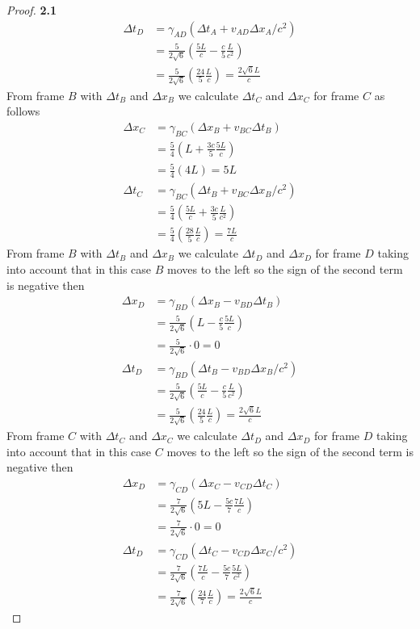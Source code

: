 \documentclass[11pt]{article}
\theoremstyle{definition}
\begin{document}
\begin{proof}{\textbf{2.1}}
\begin{align*}
            \Delta t_D &= \gamma_{AD} (\Delta t_A + v_{AD}\Delta x_A/c^2)\\
                &= \frac{5}{2\sqrt{6}}(\frac{5L}{c} - \frac{c}{5}\frac{L}{c^2}) \\
                &= \frac{5}{2\sqrt{6}}(\frac{24}{5}\frac{L}{c}) = \frac{2\sqrt{6}L}{c}
        \end{align*}
        From frame $B$ with $\Delta t_B$ and $\Delta x_B$ we calculate $\Delta t_C$ and
        $\Delta x_C$ for frame $C$ as follows
        \begin{align*}
            \Delta x_C &= \gamma_{BC}(\Delta x_B + v_{BC}\Delta t_B)\\
                &= \frac{5}{4}(L + \frac{3c}{5}\frac{5L}{c}) \\
                &= \frac{5}{4}(4L) = 5L \\
            \Delta t_C &= \gamma_{BC} (\Delta t_B + v_{BC}\Delta x_B/c^2)\\
                &= \frac{5}{4}(\frac{5L}{c} + \frac{3c}{5}\frac{L}{c^2}) \\
                &= \frac{5}{4}(\frac{28}{5}\frac{L}{c}) = \frac{7L}{c}
        \end{align*}
\cleardoublepage
        From frame $B$ with $\Delta t_B$ and $\Delta x_B$ we calculate $\Delta t_D$ and
        $\Delta x_D$ for frame $D$ taking into account that in this case $B$ moves
        to the left so the sign of the second term is negative then 
        \begin{align*}
            \Delta x_D &= \gamma_{BD}(\Delta x_B - v_{BD}\Delta t_B)\\
                &= \frac{5}{2\sqrt{6}}(L - \frac{c}{5}\frac{5L}{c}) \\
                &= \frac{5}{2\sqrt{6}} \cdot 0 = 0 \\
            \Delta t_D &= \gamma_{BD} (\Delta t_B - v_{BD}\Delta x_B/c^2)\\
                &= \frac{5}{2\sqrt{6}}(\frac{5L}{c} - \frac{c}{5}\frac{L}{c^2}) \\
                &= \frac{5}{2\sqrt{6}}(\frac{24}{5}\frac{L}{c}) = \frac{2\sqrt{6}L}{c}
        \end{align*}
        From frame $C$ with $\Delta t_C$ and $\Delta x_C$ we calculate $\Delta t_D$ and
        $\Delta x_D$ for frame $D$ taking into account that in this case $C$ moves
        to the left so the sign of the second term is negative then 
        \begin{align*}
            \Delta x_D &= \gamma_{CD}(\Delta x_C - v_{CD}\Delta t_C)\\
                &= \frac{7}{2\sqrt{6}}(5L - \frac{5c}{7}\frac{7L}{c}) \\
                &= \frac{7}{2\sqrt{6}} \cdot 0 = 0 \\
            \Delta t_D &= \gamma_{CD} (\Delta t_C - v_{CD}\Delta x_C/c^2)\\
                &= \frac{7}{2\sqrt{6}}(\frac{7L}{c} - \frac{5c}{7}\frac{5L}{c^2}) \\
                &= \frac{7}{2\sqrt{6}}(\frac{24}{7}\frac{L}{c}) = \frac{2\sqrt{6}L}{c}
        \end{align*}
    \end{proof}
\end{document}
